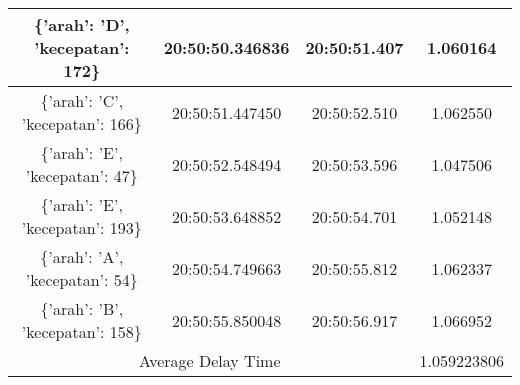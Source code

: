 \begin{longtable}{|ccc|c|}
    \multicolumn{1}{|c|}{\{'arah': 'D', 'kecepatan': 172\}} & \multicolumn{1}{c|}{20:50:50.346836} & 20:50:51.407       & 1.060164    \\ \hline
    \multicolumn{1}{|c|}{\{'arah': 'C', 'kecepatan': 166\}} & \multicolumn{1}{c|}{20:50:51.447450} & 20:50:52.510       & 1.062550    \\ \hline
    \multicolumn{1}{|c|}{\{'arah': 'E', 'kecepatan': 47\}}  & \multicolumn{1}{c|}{20:50:52.548494} & 20:50:53.596       & 1.047506    \\ \hline
    \multicolumn{1}{|c|}{\{'arah': 'E', 'kecepatan': 193\}} & \multicolumn{1}{c|}{20:50:53.648852} & 20:50:54.701       & 1.052148    \\ \hline
    \multicolumn{1}{|c|}{\{'arah': 'A', 'kecepatan': 54\}}  & \multicolumn{1}{c|}{20:50:54.749663} & 20:50:55.812       & 1.062337    \\ \hline
    \multicolumn{1}{|c|}{\{'arah': 'B', 'kecepatan': 158\}} & \multicolumn{1}{c|}{20:50:55.850048} & 20:50:56.917       & 1.066952    \\ \hline
    \multicolumn{3}{|c|}{Average Delay Time}                                                                            & 1.059223806 \\ \hline
\end{longtable}

